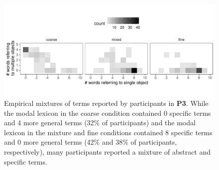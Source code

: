 \documentclass[10pt, jou, floatsintext]{apa7}
\begin{document}
 \begin{figure}
\centering
    \includegraphics[scale=.9]{mixtureOfTerms.pdf}
  \caption{Empirical mixtures of terms reported by participants in \textbf{P3}. While the modal lexicon in the coarse condition contained 0 specific terms and 4 more general terms (32\% of participants) and the modal lexicon in the mixture and fine conditions contained 8 specific terms and 0 more general terms (42\% and 38\% of participants, respectively), many participants reported a mixture of abstract and specific terms.}
  \label{fig:mixtureOfTerms}
\end{figure}
\end{document}
